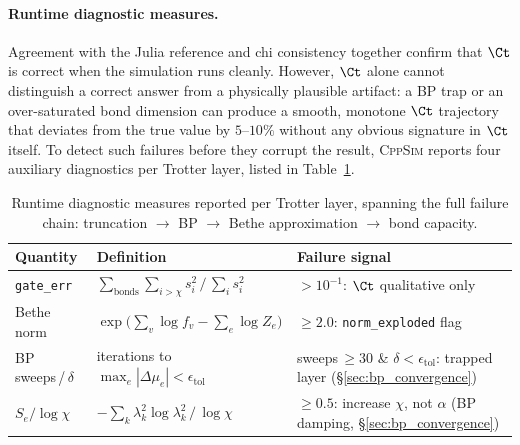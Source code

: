 \paragraph{Runtime diagnostic measures.}
Agreement with the Julia reference and chi consistency together confirm that
$\Ct$ is correct when the simulation runs cleanly.
However, $\Ct$ alone cannot distinguish a correct answer from a physically
plausible artifact: a BP trap or an over-saturated bond dimension can produce
a smooth, monotone $\Ct$ trajectory that deviates from the true value by
$5$--$10\%$ without any obvious signature in $\Ct$ itself.
To detect such failures before they corrupt the result, \textsc{CppSim} reports
four auxiliary diagnostics per Trotter layer, listed in
Table~\ref{tab:diagnostics}.

\begin{table}[ht]
\small\centering
\caption{Runtime diagnostic measures reported per Trotter layer,
  spanning the full failure chain: truncation $\to$ BP $\to$
  Bethe approximation $\to$ bond capacity.}
\label{tab:diagnostics}
\begin{tabular}{lll}
\toprule
Quantity & Definition & Failure signal \\
\midrule
\texttt{gate\_err} &
  $\sum_{\text{bonds}} \sum_{i>\chi} s_i^2 \,/\, \sum_i s_i^2$ &
  $> 10^{-1}$: $\Ct$ qualitative only \\
Bethe norm &
  $\exp\!\bigl(\sum_v \log f_v - \sum_e \log Z_e\bigr)$ &
  $\geq 2.0$: \texttt{norm\_exploded} flag \\
BP sweeps\,/\,$\delta$ &
  iterations to $\max_e|\Delta\mu_e| < \epsilon_{\mathrm{tol}}$ &
  sweeps\,$\geq 30$ \& $\delta < \epsilon_{\mathrm{tol}}$: trapped layer (\S\ref{sec:bp_convergence}) \\
$S_e / \log\chi$ &
  $-\sum_k \lambda_k^2 \log\lambda_k^2 \,/\, \log\chi$ &
  $\geq 0.5$: increase $\chi$, not $\alpha$ (BP damping, \S\ref{sec:bp_convergence}) \\
\bottomrule
\end{tabular}
\end{table}


